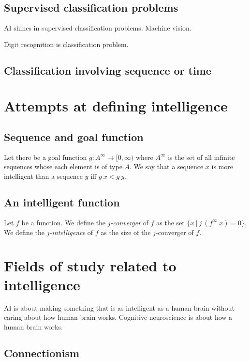 \section{Supervised classification problems}

AI shines in supervised classification problems.
Machine vision.

Digit recognition is classification problem.

\section{Classification involving sequence or time}

\chapter{Attempts at defining intelligence}

\section{Sequence and goal function}

Let there be a goal function \(g : A^\infty \to [0,\infty)\)
where \(A^\infty\) is the set of all infinite sequences whose each element is of type \(A\).
We say that a sequence \(x\) is more intelligent than a sequence \(y\) iff \(g~x < g~y\).

\section{An intelligent function}

Let \(f\) be a function.
We define the \emph{\(j\)-converger} of \(f\)
as the set \( \{ x ~|~ j~(f^\infty~x) = 0 \} \).
We define the \emph{\(j\)-intelligence} of \(f\)
as the size of the \(j\)-converger of \(f\).

\chapter{Fields of study related to intelligence}

AI is about making something
that is as intelligent as a human brain
without caring about how human brain works.
Cognitive neuroscience is about how a human brain works.

\section{Connectionism}

